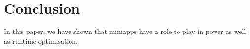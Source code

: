 \section{Conclusion} \noindent
\label{sec:conclusion}



In this paper, we have shown that miniapps have a role to play in power as well as runtime optimisation.

